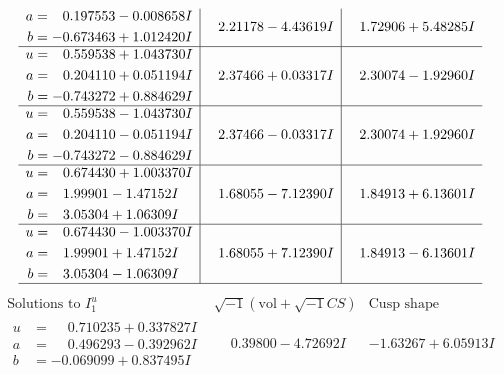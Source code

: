 \documentclass[1p]{elsarticle_modified}
\theoremstyle{definition}
\newcommand{\I}{\sqrt{-1}}
\begin{document}
$$\begin{array}{c|c|c}
\begin{aligned}
a &= \phantom{-}0.197553 - 0.008658 I \\
b &= -0.673463 + 1.012420 I\end{aligned}
 & \phantom{-}2.21178 - 4.43619 I & \phantom{-}1.72906 + 5.48285 I \\ \hline\begin{aligned}
u &= \phantom{-}0.559538 + 1.043730 I \\
a &= \phantom{-}0.204110 + 0.051194 I \\
b &= -0.743272 + 0.884629 I\end{aligned}
 & \phantom{-}2.37466 + 0.03317 I & \phantom{-}2.30074 - 1.92960 I \\ \hline\begin{aligned}
u &= \phantom{-}0.559538 - 1.043730 I \\
a &= \phantom{-}0.204110 - 0.051194 I \\
b &= -0.743272 - 0.884629 I\end{aligned}
 & \phantom{-}2.37466 - 0.03317 I & \phantom{-}2.30074 + 1.92960 I \\ \hline\begin{aligned}
u &= \phantom{-}0.674430 + 1.003370 I \\
a &= \phantom{-}1.99901 - 1.47152 I \\
b &= \phantom{-}3.05304 + 1.06309 I\end{aligned}
 & \phantom{-}1.68055 - 7.12390 I & \phantom{-}1.84913 + 6.13601 I \\ \hline\begin{aligned}
u &= \phantom{-}0.674430 - 1.003370 I \\
a &= \phantom{-}1.99901 + 1.47152 I \\
b &= \phantom{-}3.05304 - 1.06309 I\end{aligned}
 & \phantom{-}1.68055 + 7.12390 I & \phantom{-}1.84913 - 6.13601 I\\
 \hline 
 \end{array}$$\newpage$$\begin{array}{c|c|c}  
\text{Solutions to }I^u_{1}& \I (\text{vol} + \sqrt{-1}CS) & \text{Cusp shape}\\
 \hline 
\begin{aligned}
u &= \phantom{-}0.710235 + 0.337827 I \\
a &= \phantom{-}0.496293 - 0.392962 I \\
b &= -0.069099 + 0.837495 I\end{aligned}
 & \phantom{-}0.39800 - 4.72692 I & -1.63267 + 6.05913 I \\ \hline\begin{aligned}

\end{aligned}
\end{array}$$
\end{document}

